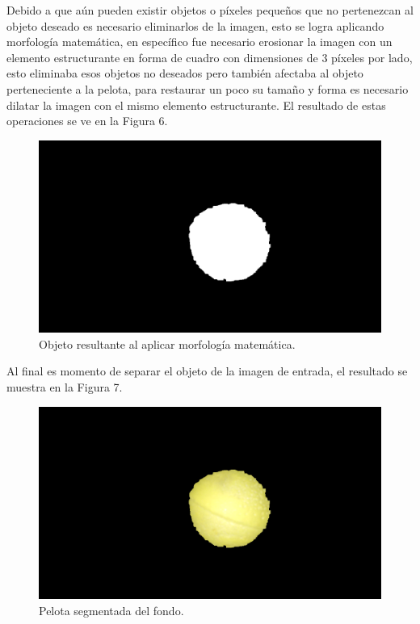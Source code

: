 \documentclass[conference]{IEEEtran}
\begin{document}
Debido a que a\'un pueden existir objetos o p\'ixeles peque\~nos que no pertenezcan al objeto deseado es necesario eliminarlos de la imagen, esto se logra aplicando morfolog\'ia matem\'atica, en espec\'ifico fue necesario erosionar la imagen con un elemento estructurante en forma de cuadro con dimensiones de $3$ p\'ixeles por lado, esto eliminaba esos objetos no deseados pero tambi\'en afectaba al objeto perteneciente a la pelota, para restaurar un poco su tama\~no y forma es necesario dilatar la imagen con el mismo elemento estructurante. El resultado de estas operaciones se ve en la Figura 6.

\begin{figure}[h]
	\setlength{\unitlength}{0.0105in}
	\centering
	\includegraphics[scale=0.20]{./images/3erosion.png}
	\caption{ Objeto resultante al aplicar morfolog\'ia matem\'atica. }
\end{figure}

Al final es momento de separar el objeto de la imagen de entrada, el resultado se muestra en la Figura 7.

\begin{figure}[h]
	\setlength{\unitlength}{0.0105in}
	\centering
	\includegraphics[scale=0.20]{./images/4segmentacion.png}
	\caption{ Pelota segmentada del fondo. }
\end{figure}
\end{document}
